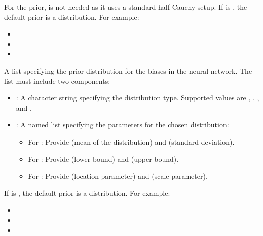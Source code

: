 \documentclass[a4paper]{book}
\begin{document}
\begin{Arguments}
\begin{ldescription}
\begin{itemize}
\end{itemize}

For the  prior,  is not needed as it uses a standard half-Cauchy setup.
If  is , the default prior is a  distribution.
For example:
\begin{itemize}

\item{} 
\item{} 
\item{} 

\end{itemize}


\item[\code{prior\_bias}] A list specifying the prior distribution for the biases in the neural network.
The list must include two components:
\begin{itemize}

\item{} : A character string specifying the distribution type. Supported values are
, , , and .
\item{} : A named list specifying the parameters for the chosen distribution:
\begin{itemize}

\item{} For : Provide  (mean of the distribution) and  (standard deviation).
\item{} For : Provide  (lower bound) and  (upper bound).
\item{} For : Provide  (location parameter) and  (scale parameter).

\end{itemize}


\end{itemize}

If  is , the default prior is a  distribution.
For example:
\begin{itemize}

\item{} 
\item{} 
\item{} 


\end{itemize}
\end{ldescription}
\end{Arguments}
\end{document}
